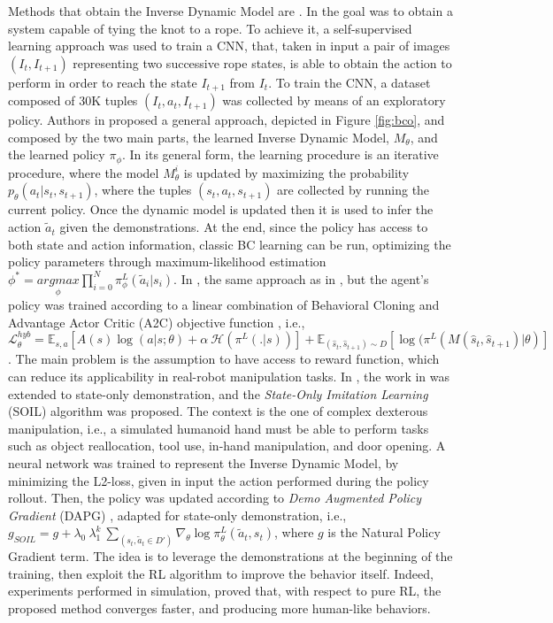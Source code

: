 \newline Methods that obtain  the Inverse Dynamic Model are \cite{nair2017combining,torabi2018bco,guo2019hybrid_rl,radosavovic2021state_only_demo}. In \cite{nair2017combining} the goal was to obtain a system capable of tying the knot to a rope. To achieve it, a self-supervised learning approach was used to train a CNN, that, taken in input a pair of images $(I_{t}, I_{t+1})$ representing two successive rope states, is able to obtain the action to perform in order to reach the state $I_{t+1}$ from $I_{t}$. To train the CNN, a dataset composed of 30K tuples $(I_{t},a_{t},I_{t+1})$ was collected by means of an exploratory policy. Authors in \cite{torabi2018bco} proposed a general approach, depicted in Figure \ref{fig:bco}, and composed by the two main parts, the learned Inverse Dynamic Model, $M_{\theta}$, and the learned policy $\pi_{\phi}$. In its general form, the learning procedure is an iterative procedure, where the model $M_{\theta}^{i}$ is updated by maximizing the probability $p_{\theta}(a_{t}|s_{t},s_{t+1})$, where the tuples $(s_{t},a_{t},s_{t+1})$ are collected by running the current policy. Once the dynamic model is updated then it is used to infer the action $\tilde{a}_{t}$ given the demonstrations. At the end, since the policy has access to both state and action information, classic BC learning can be run, optimizing the policy parameters through maximum-likelihood estimation $\phi^{*} = \underset{\phi}{argmax} \prod_{i=0}^{N} \pi^{L}_{\phi}(\tilde{a}_{i}|s_{i})$. In \cite{guo2019hybrid_rl}, the same approach as in \cite{torabi2018bco}, but the agent's policy was trained according to a linear combination of Behavioral Cloning and Advantage Actor Critic (A2C) objective function \cite{mnih2016a2c}, i.e., $\mathcal{L}^{hyb}_{\theta} = \mathbb{E}_{s,a}[A(s)\log(a|s;\theta)+\alpha \ \mathcal{H}(\pi^{L}(.|s))] + \mathbb{E}_{(\hat{s}_{t},\hat{s}_{t+1})\sim D}[\log(\pi^{L}(M(\hat{s}_{t},\hat{s}_{t+1})|\theta)]$. The main problem is the assumption to have access to reward function, which can reduce its applicability in real-robot manipulation tasks. In \cite{radosavovic2021state_only_demo}, the work in \cite{Rajeswaran18_learning_complex_dexterous} was extended to state-only demonstration, and the \textit{State-Only Imitation Learning} (SOIL) algorithm was proposed. The context is the one of complex dexterous manipulation, i.e., a simulated humanoid hand must be able to perform tasks such as object reallocation, tool use, in-hand manipulation, and door opening. A neural network was trained to represent the Inverse Dynamic Model, by minimizing the L2-loss, given in input the action performed during the policy rollout. Then, the policy was updated according to \textit{Demo Augmented Policy Gradient} (DAPG) \cite{Rajeswaran18_learning_complex_dexterous}, adapted for state-only demonstration, i.e., $g_{SOIL} = g + \lambda_{0} \ \lambda_{1}^{k} \ \sum_{(s_{t},\tilde{a}_{t} \in D')} \nabla_{\theta}\log\pi^{L}_{\theta}(\tilde{a}_{t},s_{t})$, where $g$ is the Natural Policy Gradient term. The idea is to leverage the demonstrations at the beginning of the training, then exploit the RL algorithm to improve the behavior itself. Indeed, experiments performed in simulation, proved that, with respect to pure RL, the proposed method converges faster, and producing more human-like behaviors.
